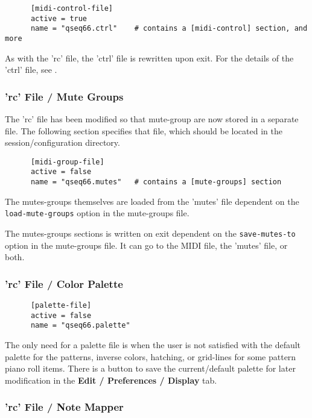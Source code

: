    \begin{verbatim}
      [midi-control-file]
      active = true
      name = "qseq66.ctrl"    # contains a [midi-control] section, and more
   \end{verbatim}

   As with the 'rc' file, the 'ctrl' file is rewritten upon exit.
   For the details of the 'ctrl' file, see
   .

\subsubsection{'rc' File / Mute Groups}
\label{subsubsec:configuration_rc_mute_groups}

   The 'rc' file has been modified so that mute-group are now stored in a
   separate file.  The following section specifies that file, which should be
   located in the session/configuration directory.

   \begin{verbatim}
      [midi-group-file]
      active = false
      name = "qseq66.mutes"   # contains a [mute-groups] section
   \end{verbatim}

   The mutes-groups themselves are loaded from the 'mutes' file dependent on
   the \texttt{load-mute-groups} option in the mute-groups file.

   The mutes-groups sections is written on exit dependent on the
   \texttt{save-mutes-to} option in the mute-groups file.
   It can go to the MIDI file, the 'mutes' file, or both.

\subsubsection{'rc' File / Color Palette}
\label{subsubsec:configuration_rc_color_palette}

   \begin{verbatim}
      [palette-file]
      active = false
      name = "qseq66.palette"
   \end{verbatim}

   The only need for a palette file is when the user is not satisfied with the
   default palette for the patterns, inverse colors, hatching,
   or grid-lines for some
   pattern piano roll items.  There is a button to save the current/default
   palette for later modification in the \textbf{Edit / Preferences / Display}
   tab.

\subsubsection{'rc' File / Note Mapper}
\label{subsubsec:configuration_rc_note_mapper}

